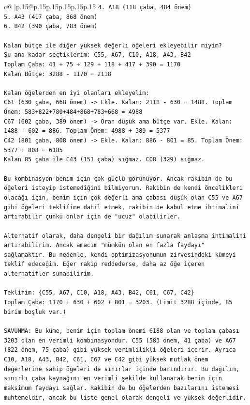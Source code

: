 \documentclass{article}
\begin{document}
{\begin{supertabular}{c@{$\;$}|p{.15\linewidth}@{}p{.15\linewidth}p{.15\linewidth}p{.15\linewidth}p{.15\linewidth}p{.15\linewidth}}
{{{\texttt{4. A18 (118 çaba, 484 önem)} \\
\texttt{5. A43 (417 çaba, 868 önem)} \\
\texttt{6. B42 (390 çaba, 783 önem)} \\
\\ 
\texttt{Kalan bütçe ile diğer yüksek değerli öğeleri ekleyebilir miyim?} \\
\texttt{Şu ana kadar seçtiklerim: C55, A67, C10, A18, A43, B42} \\
\texttt{Toplam Çaba: 41 + 75 + 129 + 118 + 417 + 390 = 1170} \\
\texttt{Kalan Bütçe: 3288 {-} 1170 = 2118} \\
\\ 
\texttt{Kalan öğelerden en iyi olanları ekleyelim:} \\
\texttt{C61 (630 çaba, 668 önem) {-}> Ekle. Kalan: 2118 {-} 630 = 1488. Toplam Önem: 583+822+780+484+868+783+668 = 4988} \\
\texttt{C67 (602 çaba, 389 önem) {-}> Oran düşük ama bütçe var. Ekle. Kalan: 1488 {-} 602 = 886. Toplam Önem: 4988 + 389 = 5377} \\
\texttt{C42 (801 çaba, 808 önem) {-}> Ekle. Kalan: 886 {-} 801 = 85. Toplam Önem: 5377 + 808 = 6185} \\
\texttt{Kalan 85 çaba ile C43 (151 çaba) sığmaz. C08 (329) sığmaz.} \\
\\ 
\texttt{Bu kombinasyon benim için çok güçlü görünüyor. Ancak rakibin de bu öğeleri isteyip istemediğini bilmiyorum. Rakibin de kendi öncelikleri olacağı için, benim için çok değerli ama çabası düşük olan C55 ve A67 gibi öğeleri teklifime dahil etmek, rakibin de kabul etme ihtimalini artırabilir çünkü onlar için de "ucuz" olabilirler.} \\
\\ 
\texttt{Alternatif olarak, daha dengeli bir dağılım sunarak anlaşma ihtimalini artırabilirim. Ancak amacım "mümkün olan en fazla faydayı" sağlamaktır. Bu nedenle, kendi optimizasyonumun zirvesindeki kümeyi teklif edeceğim. Eğer rakip reddederse, daha az öğe içeren alternatifler sunabilirim.} \\
\\ 
\texttt{Teklifim: \{C55, A67, C10, A18, A43, B42, C61, C67, C42\}} \\
\texttt{Toplam Çaba: 1170 + 630 + 602 + 801 = 3203. (Limit 3288 içinde, 85 birim boşluk var.)} \\
\\ 
\texttt{SAVUNMA: Bu küme, benim için toplam önemi 6188 olan ve toplam çabası 3203 olan en verimli kombinasyondur. C55 (583 önem, 41 çaba) ve A67 (822 önem, 75 çaba) gibi yüksek verimlilikli öğeleri içerir. Ayrıca C10, A18, A43, B42, C61, C67 ve C42 gibi yüksek mutlak önem değerlerine sahip öğeleri de sınırlar içinde barındırır. Bu dağılım, sınırlı çaba kaynağını en verimli şekilde kullanarak benim için maksimum faydayı sağlar. Rakibin de bu öğelerden bazılarını istemesi muhtemeldir, ancak bu liste genel olarak dengeli ve yüksek değerlidir.} \\
}}}
\end{supertabular}}
\end{document}
